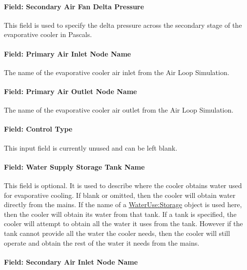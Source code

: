 \paragraph{Field: Secondary Air Fan Delta Pressure}\label{field-secondary-air-fan-delta-pressure}

This field is used to specify the delta pressure across the secondary stage of the evaporative cooler in Pascals.

\paragraph{Field: Primary Air Inlet Node Name}\label{field-primary-air-inlet-node-name-1}

The name of the evaporative cooler air inlet from the Air Loop Simulation.

\paragraph{Field: Primary Air Outlet Node Name}\label{field-primary-air-outlet-node-name-1}

The name of the evaporative cooler air outlet from the Air Loop Simulation.

\paragraph{Field: Control Type}\label{field-control-type-2}

This input field is currently unused and can be left blank.

\paragraph{Field: Water Supply Storage Tank Name}\label{field-water-supply-storage-tank-name-3}

This field is optional. It is used to describe where the cooler obtains water used for evaporative cooling. If blank or omitted, then the cooler will obtain water directly from the mains. If the name of a \hyperref[waterusestorage]{WaterUse:Storage} object is used here, then the cooler will obtain its water from that tank. If a tank is specified, the cooler will attempt to obtain all the water it uses from the tank. However if the tank cannot provide all the water the cooler needs, then the cooler will still operate and obtain the rest of the water it needs from the mains.

\paragraph{Field: Secondary Air Inlet Node Name}\label{field-secondary-air-inlet-node-name-1-000}

